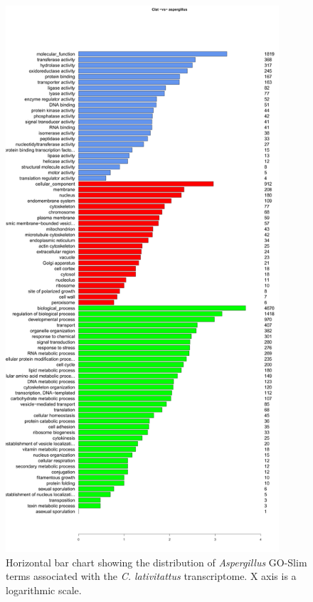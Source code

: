 \begin{figure}[hb]
  \centering
  \includegraphics[width=4in]{./Chapter_Coelomomyces/img/Clat_aspergillus_GOPlot.png}
  \caption[\textit{C. lat} transcriptome GO term distribution]{Horizontal bar chart showing the distribution of \textit{Aspergillus} GO-Slim terms associated with the \textit{C. lativitattus} transcriptome. X axis is a logarithmic scale.}
  \label{fig:ChClat_GOPlot}
\end{figure}

